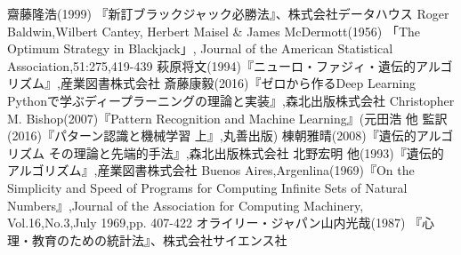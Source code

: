 \begin{thebibliography}{9}
   齋藤隆浩(1999) 『新訂ブラックジャック必勝法』、株式会社データハウス
   Roger Baldwin,Wilbert Cantey, Herbert Maisel \& James McDermott(1956) 「The Optimum Strategy in Blackjack」, Journal of the American Statistical Association,51:275,419-439
   萩原将文(1994)『ニューロ・ファジィ・遺伝的アルゴリズム』,産業図書株式会社
   斎藤康毅(2016)『ゼロから作るDeep Learning Pythonで学ぶディープラーニングの理論と実装』,森北出版株式会社
   Christopher M. Bishop(2007)『Pattern Recognition and Machine Learning』(元田浩 他 監訳(2016)『パターン認識と機械学習 上』,丸善出版)
   棟朝雅晴(2008)『遺伝的アルゴリズム その理論と先端的手法』,森北出版株式会社
   北野宏明 他(1993)『遺伝的アルゴリズム』,産業図書株式会社
   Buenos Aires,Argenlina(1969)『On the Simplicity and Speed of Programs for Computing Infinite Sets of Natural Numbers』,Journal of the Association for Computing Machinery, Vol.16,No.3,July 1969,pp. 407-422
   オライリー・ジャパン山内光哉(1987) 『心理・教育のための統計法』、株式会社サイエンス社
\end{thebibliography}